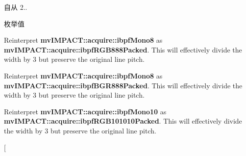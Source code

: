 \begin{DoxySince}{自从}
2.. 
\end{DoxySince}
\begin{Desc}
\item[枚举值]\par
\begin{description}
\item[{\em 
\hypertarget{group___common_interface_gga077e155accbe145213c1c34895f961f2a3290631051651cc3c674d14d83c9cad7}{ibfrm\+Mono8\+\_\+\+To\+\_\+\+R\+G\+B888\+Packed}\label{group___common_interface_gga077e155accbe145213c1c34895f961f2a3290631051651cc3c674d14d83c9cad7}
}]Reinterpret {\bfseries mv\+I\+M\+P\+A\+C\+T\+::acquire\+::ibpf\+Mono8} as {\bfseries mv\+I\+M\+P\+A\+C\+T\+::acquire\+::ibpf\+R\+G\+B888\+Packed}. This will effectively divide the width by 3 but preserve the original line pitch. \item[{\em 
\hypertarget{group___common_interface_gga077e155accbe145213c1c34895f961f2a46fa94564c02bb7590909e0427fb38d8}{ibfrm\+Mono8\+\_\+\+To\+\_\+\+B\+G\+R888\+Packed}\label{group___common_interface_gga077e155accbe145213c1c34895f961f2a46fa94564c02bb7590909e0427fb38d8}
}]Reinterpret {\bfseries mv\+I\+M\+P\+A\+C\+T\+::acquire\+::ibpf\+Mono8} as {\bfseries mv\+I\+M\+P\+A\+C\+T\+::acquire\+::ibpf\+B\+G\+R888\+Packed}. This will effectively divide the width by 3 but preserve the original line pitch. \item[{\em 
\hypertarget{group___common_interface_gga077e155accbe145213c1c34895f961f2ae5d88a3ba3957b3be0a5bb400b8ee5e6}{ibfrm\+Mono10\+\_\+\+To\+\_\+\+R\+G\+B101010\+Packed}\label{group___common_interface_gga077e155accbe145213c1c34895f961f2ae5d88a3ba3957b3be0a5bb400b8ee5e6}
}]Reinterpret {\bfseries mv\+I\+M\+P\+A\+C\+T\+::acquire\+::ibpf\+Mono10} as {\bfseries mv\+I\+M\+P\+A\+C\+T\+::acquire\+::ibpf\+R\+G\+B101010\+Packed}. This will effectively divide the width by 3 but preserve the original line pitch. \item[{\em 
}
\end{description}
\end{Desc}
